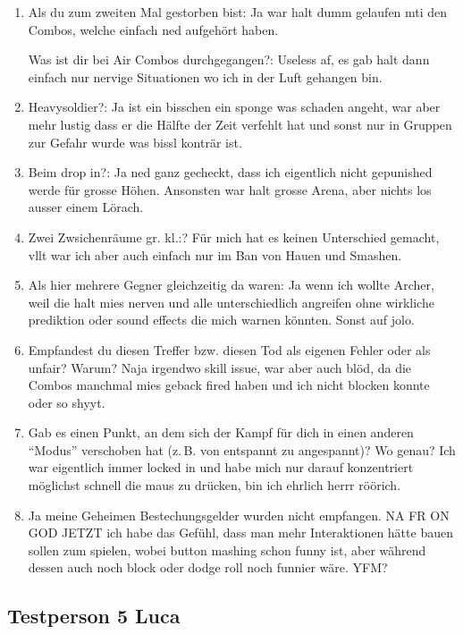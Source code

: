 \documentclass[../Main.tex]{subfiles}
\begin{document}
\begin{enumerate}[label=\textbf{I\arabic*}, leftmargin=1.5cm, itemsep=0.5em]
    \item Als du zum zweiten Mal gestorben bist: Ja war halt dumm gelaufen mti den Combos, welche einfach ned aufgehört haben.

    Was ist dir bei Air Combos durchgegangen?: Useless af, es gab halt dann einfach nur nervige Situationen wo ich in der Luft gehangen bin.


    \item Heavysoldier?: Ja ist ein bisschen ein sponge was schaden angeht, war aber mehr lustig dass er die Hälfte der Zeit verfehlt hat und sonst nur in Gruppen zur Gefahr wurde was bissl konträr ist.
    \item Beim drop in?: Ja ned ganz gecheckt, dass ich eigentlich nicht gepunished werde für grosse Höhen. Ansonsten war halt grosse Arena, aber nichts los ausser einem Lörach.
    \item Zwei Zwsichenräume gr. kl.:? Für mich hat es keinen Unterschied gemacht, vllt war ich aber auch einfach nur im Ban von Hauen und Smashen.
    \item Als hier mehrere Gegner gleichzeitig da waren: Ja wenn ich wollte Archer, weil die halt mies nerven und alle unterschiedlich angreifen ohne wirkliche prediktion oder sound effects die mich warnen könnten. Sonst auf jolo.
    \item Empfandest du diesen Treffer bzw. diesen Tod als eigenen Fehler oder als unfair? Warum? Naja irgendwo skill issue, war aber auch blöd, da die Combos manchmal mies geback fired haben und ich nicht blocken konnte oder so shyyt.
    \item Gab es einen Punkt, an dem sich der Kampf für dich in einen anderen \enquote{Modus} verschoben hat (z.\,B. von entspannt zu angespannt)? Wo genau?
    Ich war eigentlich immer locked in und habe mich nur darauf konzentriert möglichst schnell die maus zu drücken, bin ich ehrlich herrr röörich. 
    \item Ja meine Geheimen Bestechungsgelder wurden nicht empfangen. NA FR ON GOD JETZT ich habe das Gefühl, dass man mehr Interaktionen hätte bauen sollen zum spielen, wobei button mashing schon funny ist, aber während dessen auch noch block oder dodge roll noch funnier wäre. YFM?
\end{enumerate}

\subsection{Testperson 5 Luca}
\end{document}
